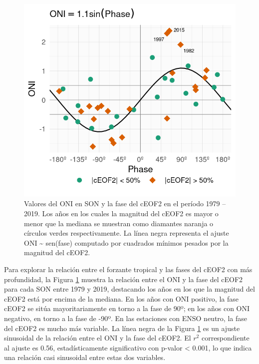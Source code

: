 \documentclass[12pt,oneside]{reedthesis}
\begin{document}
\begin{figure}
\includegraphics{figures/20-ceofs/enso-phase-1} \caption{Valores del ONI en SON y la fase del cEOF2 en el período 1979 -- 2019.
Los años en los cuales la magnitud del cEOF2 es mayor o menor que la mediana se muestran como diamantes naranja o círculos verdes respectivamente.
La línea negra representa el ajuste ONI \textasciitilde{} sen(fase) computado por cuadrados mínimos pesados por la magnitud del cEOF2.}\label{fig:enso-phase}
\end{figure}

Para explorar la relación entre el forzante tropical y las fases del cEOF2 con más profundidad, la Figura \ref{fig:enso-phase} muestra la relación entre el ONI y la fase del cEOF2 para cada SON entre 1979 y 2019, destacando los años en los que la magnitud del cEOF2 está por encima de la mediana.
En los años con ONI positivo, la fase cEOF2 se sitúa mayoritariamente en torno a la fase de 90º; en los años con ONI negativo, en torno a la fase de -90º.
En las estaciones con ENSO neutro, la fase del cEOF2 es mucho más variable.
La línea negra de la Figura \ref{fig:enso-phase} es un ajuste sinusoidal de la relación entre el ONI y la fase del cEOF2.
El \(r^2\) correspondiente al ajuste es 0.56, estadísticamente significativo con p-valor \textless{} 0.001, lo que indica una relación casi sinusoidal entre estas dos variables.
\end{document}

